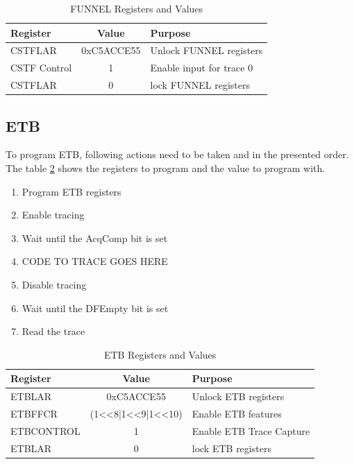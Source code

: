 \documentclass[10pt,a4paper, oneside]{memoir}
\begin{document}
\begin{table}[]
	\centering
	\begin{tabular}{lcl}
	\toprule
	\textbf{Register} & \textbf{Value} & \textbf{Purpose} \\
	\midrule
	CSTFLAR 	& 	0xC5ACCE55  	& 	Unlock FUNNEL registers\\ 
	CSTF Control	&	1			&	Enable input for trace 0 \\
	CSTFLAR 	& 	0  			& 	lock FUNNEL registers    \\ 	
	\bottomrule
	\end{tabular}
	\caption{FUNNEL Registers and Values}
	\label{tab:funnel_registers_and_values}
\end{table}


\subsection{ETB}
To program ETB, following actions need to be taken and in the presented order. The table \ref{tab:etb_register_values} shows the registers to program and the value to program with.

\begin{enumerate}
\item Program ETB registers
\item Enable tracing
\item Wait until the AcqComp bit is set
\item CODE TO TRACE GOES HERE
\item Disable tracing
\item Wait until the DFEmpty bit is set
\item Read the trace
\end{enumerate}

\begin{table}[]
	\centering
	\begin{tabular}{lcl}
	\toprule
	\textbf{Register} & \textbf{Value} & \textbf{Purpose} \\
	\midrule
	ETBLAR 	& 	0xC5ACCE55  		& 	Unlock ETB registers	\\ 
	ETBFFCR 	&	(1<<8|1<<9|1<<10)	&	Enable ETB features	\\
	ETBCONTROL&	1				&	Enable ETB Trace Capture	\\
	ETBLAR 	& 	0  				& 	lock ETB registers		\\ 	
	\bottomrule
	\end{tabular}
	\caption{ETB Registers and Values}
	\label{tab:etb_register_values}
\end{table}
\end{document}
